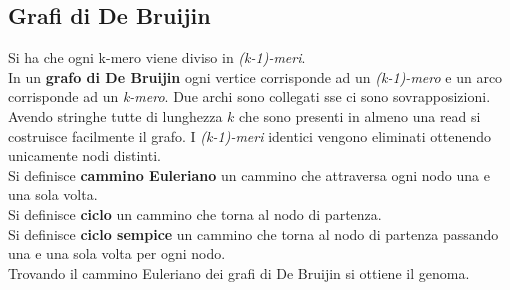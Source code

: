 \documentclass[a4paper,12pt, oneside]{book}
\begin{document}
\subsection{Grafi di De Bruijin}
Si ha che ogni k-mero viene diviso in \textit{(k-1)-meri}. \\
In un \textbf{grafo di De Bruijin} ogni vertice corrisponde ad un
\textit{(k-1)-mero} e un arco corrisponde ad un \textit{k-mero}. Due
archi sono collegati sse ci sono sovrapposizioni. Avendo stringhe
tutte di lunghezza $k$ che sono presenti in almeno una read si
costruisce facilmente il grafo. I \textit{(k-1)-meri} identici vengono
eliminati ottenendo unicamente nodi distinti. \\
Si definisce \textbf{cammino Euleriano} un cammino che attraversa ogni
nodo una e una sola volta.\\
Si definisce \textbf{ciclo} un cammino che torna al nodo di partenza.\\
Si definisce \textbf{ciclo sempice} un cammino che torna al nodo di partenza
passando una e una sola volta per ogni nodo.\\
Trovando il cammino Euleriano dei grafi di De Bruijin si ottiene il
genoma.
\end{document}
